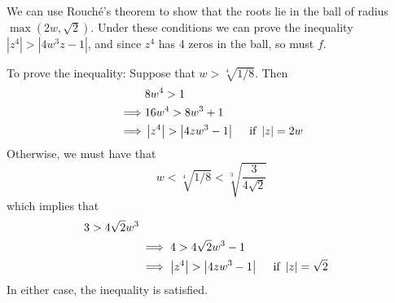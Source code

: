 \documentclass{homework}
\begin{document}
                                                                                                                         \begin{solution}

                                                                                                                         We can use Rouch\'e's theorem to show that the roots lie in the ball of radius $\max(2w, \sqrt{2})$. Under these conditions we can prove the inequality $|z^4|>|4w^3z - 1|$, and since $z^4$ has 4 zeros in the ball, so must $f$.

                                                                                                                         To prove the inequality: Suppose that $w>\sqrt[4]{1/8}$. Then 
                                                                                                                         \begin{align*}
                                                                                                                         &8w^4 > 1 \\
                                                                                                                         \implies &16w^4 > 8w^3 + 1\\
                                                                                                                         \implies &\left|z^4\right| > \left|4zw^3 - 1\right| \quad \text{ if } \left|z\right| = 2w
                                                                                                                         \end{align*}
                                                                                                                         Otherwise, we must have that 
                                                                                                                         \[w<\sqrt[4]{1/8}< \sqrt[3]{\frac{3}{4\sqrt{2}}}\]
                                                                                                                         which implies that
                                                                                                                         \begin{align*}
                                                                                                                         3 > 4\sqrt{2}w^3\\
                                                                                                                         &\implies 4 > 4\sqrt{2}w^3 - 1\\
                                                                                                                         &\implies \left|z^4\right| > \left|4zw^3 - 1\right| \quad \text{ if } \left|z\right| = \sqrt{2}
                                                                                                                         \end{align*}
                                                                                                                         In either case, the inequality is satisfied.


\end{solution}
\end{document}

